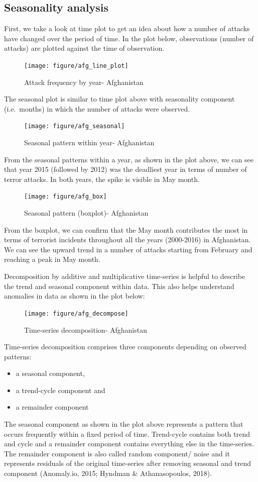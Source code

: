 \documentclass[11pt,oneside,a4paper]{reedthesis}
\providecommand{\tightlist}{%
  \setlength{\itemsep}{0pt}\setlength{\parskip}{0pt}}
\begin{document}
\subsection{Seasonality analysis}\label{seasonality-analysis}

First, we take a look at time plot to get an idea about how a number of
attacks have changed over the period of time. In the plot below,
observations (number of attacks) are plotted against the time of
observation.
\begin{figure}
\texttt{[image: figure/afg\_line\_plot]} \caption{Attack frequency by year- Afghanistan}\label{fig:unnamed-chunk-55}
\end{figure}
The seasonal plot is similar to time plot above with seasonality
component (i.e.~months) in which the number of attacks were observed.
\begin{figure}
\texttt{[image: figure/afg\_seasonal]} \caption{Seasonal pattern within year- Afghanistan}\label{fig:unnamed-chunk-56}
\end{figure}
From the seasonal patterns within a year, as shown in the plot above, we
can see that year 2015 (followed by 2012) was the deadliest year in
terms of number of terror attacks. In both years, the spike is visible
in May month.
\begin{figure}
\texttt{[image: figure/afg\_box]} \caption{Seasonal pattern (boxplot)- Afghanistan}\label{fig:unnamed-chunk-57}
\end{figure}
From the boxplot, we can confirm that the May month contributes the most
in terms of terrorist incidents throughout all the years (2000-2016) in
Afghanistan. We can see the upward trend in a number of attacks starting
from February and reaching a peak in May month.

Decomposition by additive and multiplicative time-series is helpful to
describe the trend and seasonal component within data. This also helps
understand anomalies in data as shown in the plot below:
\begin{figure}
\texttt{[image: figure/afg\_decompose]} \caption{Time-series decomposition- Afghanistan}\label{fig:unnamed-chunk-58}
\end{figure}
Time-series decomposition comprises three components depending on
observed patterns:
\begin{itemize}
\tightlist
\item
  a seasonal component,
\item
  a trend-cycle component and
\item
  a remainder component
\end{itemize}
The seasonal component as shown in the plot above represents a pattern
that occurs frequently within a fixed period of time. Trend-cycle
contains both trend and cycle and a remainder component contains
everything else in the time-series. The remainder component is also
called random component/ noise and it represents residuals of the
original time-series after removing seasonal and trend component
(Anomaly.io, 2015; Hyndman \& Athanasopoulos, 2018).
\end{document}
